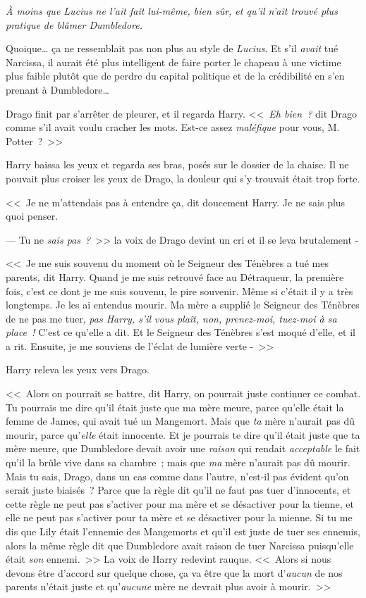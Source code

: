 \emph{À moins que Lucius ne l'ait fait lui-même, bien sûr, et qu'il n'ait trouvé plus pratique de blâmer Dumbledore.}

Quoique… ça ne ressemblait pas non plus au style de \emph{Lucius}. Et s'il \emph{avait} tué Narcissa, il aurait été plus intelligent de faire porter le chapeau à une victime plus faible plutôt que de perdre du capital politique et de la crédibilité en s'en prenant à Dumbledore…

Drago finit par s'arrêter de pleurer, et il regarda Harry. <<~\emph{Eh bien~?} dit Drago comme s'il avait voulu cracher les mots. Est-ce assez \emph{maléfique} pour vous, M. Potter~?~>>

Harry baissa les yeux et regarda ses bras, posés sur le dossier de la chaise. Il ne pouvait plus croiser les yeux de Drago, la douleur qui s'y trouvait était trop forte.

<<~Je ne m'attendais pas à entendre ça, dit doucement Harry. Je ne sais plus quoi penser.

--- Tu ne \emph{sais pas~?}~>> la voix de Drago devint un cri et il se leva brutalement -

<<~Je me suis souvenu du moment où le Seigneur des Ténèbres a tué mes parents, dit Harry. Quand je me suis retrouvé face au Détraqueur, la première fois, c'est ce dont je me suis souvenu, le pire souvenir. Même si c'était il y a très longtemps. Je les ai entendus mourir. Ma mère a supplié le Seigneur des Ténèbres de ne pas me tuer, \emph{pas Harry, s'il vous plaît, non, prenez-moi, tuez-moi à sa place~!} C'est ce qu'elle a dit. Et le Seigneur des Ténèbres s'est moqué d'elle, et il a rit. Ensuite, je me souviens de l'éclat de lumière verte -~>>

Harry releva les yeux vers Drago.

<<~Alors on pourrait se battre, dit Harry, on pourrait juste continuer ce combat. Tu pourrais me dire qu'il était juste que ma mère meure, parce qu'elle était la femme de James, qui avait tué un Mangemort. Mais que \emph{ta} mère n'aurait pas dû mourir, parce qu'\emph{elle} était innocente. Et je pourrais te dire qu'il était juste que ta mère meure, que Dumbledore devait avoir une \emph{raison} qui rendait \emph{acceptable} le fait qu'il la brûle vive dans sa chambre~; mais que \emph{ma} mère n'aurait pas dû mourir. Mais tu sais, Drago, dans un cas comme dans l'autre, n'est-il pas évident qu'on serait juste biaisés~? Parce que la règle dit qu'il ne faut pas tuer d'innocents, et cette règle ne peut pas s'activer pour ma mère et se désactiver pour la tienne, et elle ne peut pas s'activer pour ta mère et se désactiver pour la mienne. Si tu me dis que Lily était l'ennemie des Mangemorts et qu'il est juste de tuer ses ennemis, alors la même règle dit que Dumbledore avait raison de tuer Narcissa puisqu'elle était \emph{son} ennemi.~>> La voix de Harry redevint rauque. <<~Alors si nous devons être d'accord sur quelque chose, ça va être que la mort d'\emph{aucun} de nos parents n'était juste et qu'\emph{aucune} mère ne devrait plus avoir à mourir.~>>

